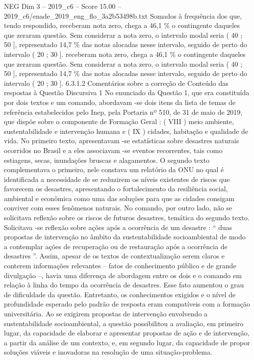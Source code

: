 \begin{textsample}{NEG Dim 3 – 2019\_c6 – Score 15.00 – 2019\_c6/enade\_2019\_eng\_flo\_3a2b53498b.txt}
Somados à frequência dos que, tendo respondido, receberam nota zero, chega a 46,1 \% o contingente daqueles que zeraram questão.
Sem considerar a nota zero, o intervalo modal seria ( 40 ; 50 ], representado 14,7 \% das notas alocadas nesse intervalo, seguido de perto do intervalo ( 20 ; 30 ]. receberam nota zero, chega a 46,1 \% o contingente daqueles que zeraram questão.
Sem considerar a nota zero, o intervalo modal seria ( 40 ; 50 ], representado 14,7 \% das notas alocadas nesse intervalo, seguido de perto do intervalo ( 20 ; 30 ]. 6.3.1.2 Comentários sobre a correção de Conteúdo das respostas à Questão Discursiva 1 No enunciado da Questão 1, que era constituída por dois textos e um comando, abordavam -se dois itens da lista de temas de referência estabelecidos pelo Inep, pela Portaria nº 510, de 31 de maio de 2019, que dispõe sobre o componente de Formação Geral : ( VIII ) meio ambiente, sustentabilidade e intervenção humana e ( IX ) cidades, habitação e qualidade de vida.
No primeiro texto, apresentavam -se estatísticas sobre desastres naturais ocorridos no Brasil e a eles associavam -se eventos recorrentes, tais como estiagens, secas, inundações bruscas e alagamentos.
O segundo texto complementava o primeiro, nele constava um relatório da ONU no qual é identificada a necessidade de se reduzirem os níveis existentes de riscos que favorecem os desastres, apresentando o fortalecimento da resiliência social, ambiental e econômica como uma das soluções para que as cidades consigam conviver com esses fenômenos naturais.
No comando, por outro lado, não se solicitava reflexão sobre os riscos de futuros desastres, temática do segundo texto.
Solicitava -se reflexão sobre ações após a ocorrência de um desastre : “ duas propostas de intervenção no âmbito da sustentabilidade socioambiental de modo a contemplar ações de recuperação ou de restauração após a ocorrência de desastres ”.
Assim, apesar de os textos de contextualização serem claros e conterem informações relevantes – fatos de conhecimento público e de grande divulgação –, havia uma diferença de abordagem entre os dois e o comando em relação à linha do tempo da ocorrência de desastres.
Esse fato aumentou o grau de dificuldade da questão.
Entretanto, os conhecimentos exigidos e o nível de profundidade esperado pelo padrão de resposta eram compatíveis com a formação universitária.
Ao se exigirem propostas de intervenção envolvendo a sustentabilidade socioambiental, a questão possibilitou a avaliação, em primeiro lugar, da capacidade de elaborar e apresentar propostas de ação e de intervenção, a partir da análise de um contexto, e, em segundo lugar, da capacidade de propor soluções viáveis e inovadoras na resolução de uma situação-problema.

\end{textsample}
